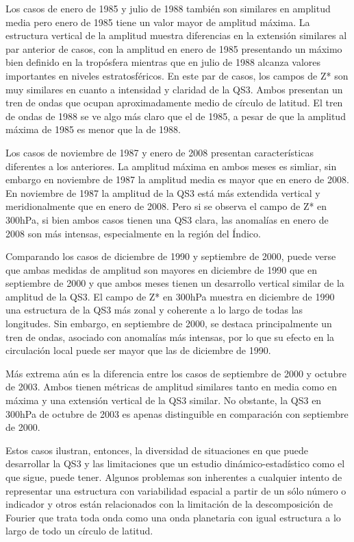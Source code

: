 \documentclass[spanish,a4paper,12pt,oneside]{book}
\begin{document}
Los casos de enero de 1985 y julio de 1988 también son similares en
amplitud media pero enero de 1985 tiene un valor mayor de amplitud
máxima. La estructura vertical de la amplitud muestra diferencias en la
extensión similares al par anterior de casos, con la amplitud en enero
de 1985 presentando un máximo bien definido en la tropósfera mientras
que en julio de 1988 alcanza valores importantes en niveles
estratosféricos. En este par de casos, los campos de Z* son muy
similares en cuanto a intensidad y claridad de la QS3. Ambos presentan
un tren de ondas que ocupan aproximadamente medio de círculo de latitud.
El tren de ondas de 1988 se ve algo más claro que el de 1985, a pesar de
que la amplitud máxima de 1985 es menor que la de 1988.

Los casos de noviembre de 1987 y enero de 2008 presentan características
diferentes a los anteriores. La amplitud máxima en ambos meses es
simliar, sin embargo en noviembre de 1987 la amplitud media es mayor que
en enero de 2008. En noviembre de 1987 la amplitud de la QS3 está más
extendida vertical y meridionalmente que en enero de 2008. Pero si se
observa el campo de Z* en 300hPa, si bien ambos casos tienen una QS3
clara, las anomalías en enero de 2008 son más intensas, especialmente en
la región del Índico.

Comparando los casos de diciembre de 1990 y septiembre de 2000, puede
verse que ambas medidas de amplitud son mayores en diciembre de 1990 que
en septiembre de 2000 y que ambos meses tienen un desarrollo vertical
similar de la amplitud de la QS3. El campo de Z* en 300hPa muestra en
diciembre de 1990 una estructura de la QS3 más zonal y coherente a lo
largo de todas las longitudes. Sin embargo, en septiembre de 2000, se
destaca principalmente un tren de ondas, asociado con anomalías más
intensas, por lo que su efecto en la circulación local puede ser mayor
que las de diciembre de 1990.

Más extrema aún es la diferencia entre los casos de septiembre de 2000 y
octubre de 2003. Ambos tienen métricas de amplitud similares tanto en
media como en máxima y una extensión vertical de la QS3 similar. No
obstante, la QS3 en 300hPa de octubre de 2003 es apenas distinguible en
comparación con septiembre de 2000.

Estos casos ilustran, entonces, la diversidad de situaciones en que
puede desarrollar la QS3 y las limitaciones que un estudio
dinámico-estadístico como el que sigue, puede tener. Algunos problemas
son inherentes a cualquier intento de representar una estructura con
variabilidad espacial a partir de un sólo número o indicador y otros
están relacionados con la limitación de la descomposición de Fourier que
trata toda onda como una onda planetaria con igual estructura a lo largo
de todo un círculo de latitud.
\end{document}

